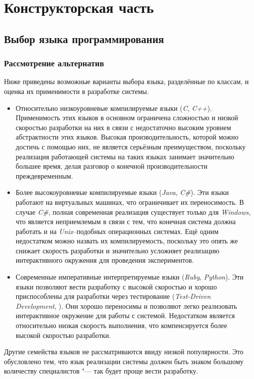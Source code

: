 \section{Конструкторская часть}
\subsection{Выбор языка программирования}
\subsubsection{Рассмотрение альтернатив}
Ниже приведены возможные варианты выбора языка, разделённые по классам, и оценка их применимости в разработке системы.
\begin{itemize}
    \item Относительно низкоуровневые компилируемые языки (\textit{C}, \textit{C++}). Применимость этих языков в основном ограничена сложностью и низкой скоростью разработки на них в связи с недостаточно высоким уровнем абстрактности этих языков. Высокая производительность, которой можно достичь с помощью них, не является серьёзным преимуществом, поскольку реализация работающей системы на таких языках занимает значительно большее время, делая разговор о конечной производительности преждевременным.
    \item Более высокоуровневые компилируемые языки (\textit{Java}, \textit{C\#}). Эти языки работают на виртуальных машинах, что ограничивает их переносимость. В случае \textit{C\#}, полная современная реализация существует только для \textit{Windows}, что является неприемлемым в связи с тем, что конечная система должна работать и на \textit{Unix}--подобных операционных системах. Ещё одним недостатком можно назвать их компилируемость, поскольку это опять же снижает скорость разработки и значительно усложняет реализацию интерактивного окружения для проведения экспериментов.
    \item Современные императивные интерпретируемые языки (\textit{Ruby}, \textit{Python}). Эти языки позволяют вести разработку с высокой скоростью и хорошо приспособлены для разработки через тестирование (\textit{Test-Driven Development}, \cite{tdd}). Они хорошо переносимы и позволяют легко реализовать интерактивное окружение для работы с системой. Недостатком является относительно низкая скорость выполнения, что компенсируется более высокой скоростью разработки.
\end{itemize}
Другие семейства языков не рассматриваются ввиду низкой популярности. Это обусловлено тем, что язык реализации системы должен быть знаком большому количеству специалистов "--- так будет проще вести  разработку.


